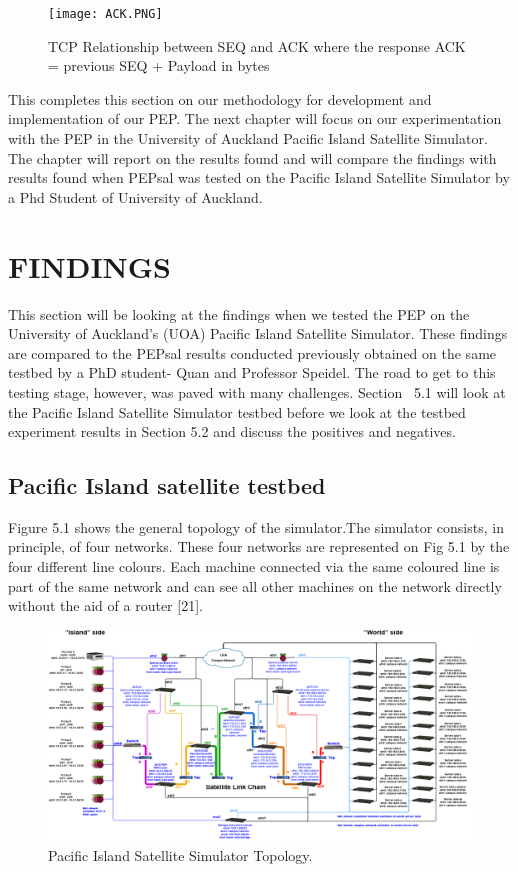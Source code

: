 \documentclass{uathesis}
\begin{document}
\begin{figure}[h!]
    \centering
    \texttt{[image: ACK.PNG]}
    \caption{TCP Relationship between SEQ and ACK where the response ACK = previous SEQ + Payload in bytes}
    \label{fig: TCP SEQ + ACK} 
\end{figure}

This completes this section on our methodology for development and implementation of our PEP. The next chapter will focus on our experimentation with the PEP in the University of Auckland Pacific Island Satellite Simulator. The chapter will report on the results found and will compare the findings with results found when PEPsal was tested on the Pacific Island Satellite Simulator by a Phd Student of University of Auckland. 

\chapter{FINDINGS}
This section will be looking at the findings when we tested the PEP on the University of Auckland's (UOA) Pacific Island Satellite Simulator. These findings are compared to the PEPsal results conducted previously obtained on the same testbed by a PhD student- Quan and Professor Speidel. The road to get to this testing stage, however, was paved with many challenges. Section ~5.1 will look at the Pacific Island Satellite Simulator testbed before we look at the testbed experiment results in Section 5.2 and discuss the positives and negatives.  \\

\section{Pacific Island satellite testbed}
Figure 5.1 shows the general topology of the simulator.The simulator consists, in principle, of four networks. These four networks are represented on Fig 5.1 by the four different line colours. Each machine connected via the same coloured line is part of the same network and can see all other machines on the network directly without the aid of a router [21]. \\
\begin{figure}[ht!]
    \centering
    \includegraphics[width=1.3\textwidth, angle =270]{Simulator.png}
    \caption{Pacific Island Satellite Simulator Topology. }
    \label{fig: 120K queues} 
\end{figure}
\end{document}
